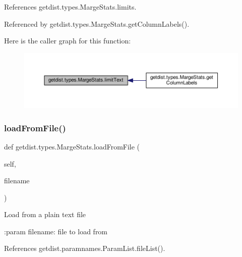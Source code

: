References getdist.\+types.\+Marge\+Stats.\+limits.



Referenced by getdist.\+types.\+Marge\+Stats.\+get\+Column\+Labels().

Here is the caller graph for this function\+:
\nopagebreak
\begin{figure}[H]
\begin{center}
\leavevmode
\includegraphics[width=350pt]{classgetdist_1_1types_1_1MargeStats_a08ede992eb83354249dfd689e1f3d9bf_icgraph}
\end{center}
\end{figure}
\mbox{\label{classgetdist_1_1types_1_1MargeStats_a9192b3334c2fc85bbe5fec3ca93af501}} 
\subsubsection{\texorpdfstring{load\+From\+File()}{loadFromFile()}}
{\footnotesize\ttfamily def getdist.\+types.\+Marge\+Stats.\+load\+From\+File (\begin{DoxyParamCaption}\item[{}]{self,  }\item[{}]{filename }\end{DoxyParamCaption})}

\begin{DoxyVerb}Load from a plain text file

:param filename: file to load from
\end{DoxyVerb}
 

References getdist.\+paramnames.\+Param\+List.\+file\+List().

